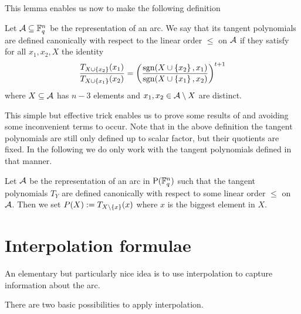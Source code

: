 This lemma enables us now to make the following definition

\begin{definition}
    Let $\mathcal{A}\subseteq\mathbb{F}_{q}^n$ be the representation of an arc. We say that its tangent polynomials are defined canonically with respect to the linear order $\leq$ on $\mathcal{A}$ if they satisfy for all $x_1,x_2,X$ the identity
    $$
    \frac{T_{X\cup\left\{x_2\right\}}(x_1)}{T_{X\cup\left\{x_1\right\}}(x_2)} = {\left(\frac{\mathop\mathrm{sgn}(X\cup\left\{x_2\right\},x_1)}{\mathop\mathrm{sgn}(X\cup\left\{x_1\right\},x_2)}\right)}^{t+1}
    $$
    where $X\subseteq \mathcal{A}$ has $n-3$ elements and $x_1,x_2\in \mathcal{A}\setminus X$ are distinct.
\end{definition}

\begin{remark}
    This simple but effective trick enables us to prove some results of  and  avoiding some inconvenient terms to occur.
    Note that in the above definition the tangent polynomials are still only defined up to scalar factor, but their quotients are fixed.
    In the following we do only work with the tangent polynomials defined in that manner.
\end{remark}

\begin{definition}\label{tang-pol-eval}
    Let $\mathcal{A}$ be the representation of an arc in $\P(\field{q}^n)$ such that the tangent polynomials $T_Y$ are defined canonically with respect to some linear order $\leq$ on $\mathcal{A}$. Then we set $P(X):=T_{X\setminus\left\{x\right\}}(x)$ where $x$ is the biggest element in  $X$.
\end{definition}

\section{Interpolation formulae}

An elementary but particularly nice idea is to use interpolation to capture information about the arc.

There are two basic possibilities to apply interpolation. 

